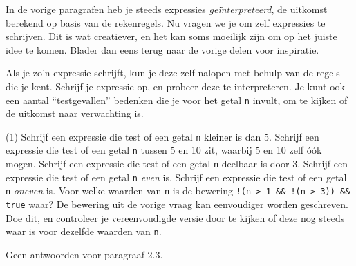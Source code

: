 In de vorige paragrafen heb je steeds expressies \emph{geïnterpreteerd}, de uitkomst berekend op basis van de rekenregels. Nu vragen we je om zelf expressies te schrijven. Dit is wat creatiever, en het kan soms moeilijk zijn om op het juiste idee te komen. Blader dan eens terug naar de vorige delen voor inspiratie.

Als je zo'n expressie schrijft, kun je deze zelf nalopen met behulp van de regels die je kent. Schrijf je expressie op, en probeer deze te interpreteren. Je kunt ook een aantal ``testgevallen'' bedenken die je voor het getal \texttt{n} invult, om te kijken of de uitkomst naar verwachting is.

\begin{exercise}
    \begin{longtasks}[resume=true](1)
        \task
        Schrijf een expressie die test of een getal \texttt{n} kleiner is dan 5.
        \task
        Schrijf een expressie die test of een getal \texttt{n} tussen 5 en 10 zit, waarbij 5 en 10 zelf \'{o}\'{o}k mogen.
        \task
        Schrijf een expressie die test of een getal \texttt{n} deelbaar is door 3.
        \task
        Schrijf een expressie die test of een getal \texttt{n} \emph{even} is.
        \task
        Schrijf een expressie die test of een getal \texttt{n} \emph{oneven} is.
        \task
        Voor welke waarden van \texttt{n} is de bewering \texttt{!(n > 1 \&\& !(n > 3)) \&\& true} waar?
        \task
        De bewering uit de vorige vraag kan eenvoudiger worden geschreven. Doe dit, en controleer je vereenvoudigde versie door te kijken of deze nog steeds waar is voor dezelfde waarden van \texttt{n}.
    \end{longtasks}
\end{exercise}

\begin{solution}
    Geen antwoorden voor paragraaf 2.3.
\end{solution}








